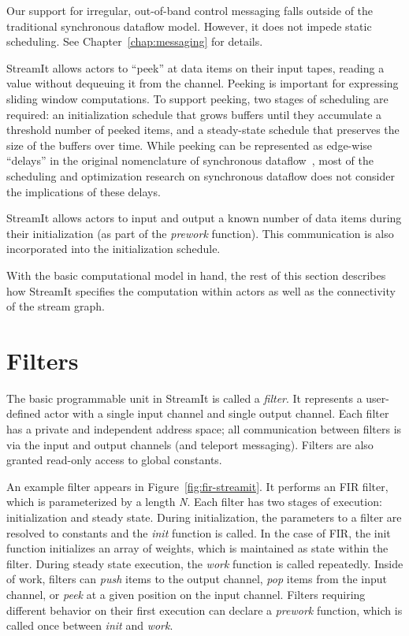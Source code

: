   Our support for irregular,
  out-of-band control messaging falls outside of the traditional
  synchronous dataflow model.  However, it does not impede static
  scheduling.  See Chapter~\ref{chap:messaging} for details.

  StreamIt allows actors to ``peek'' at data items 
  on their input tapes, reading a value without dequeuing it from the
  channel.  Peeking is important for expressing sliding window
  computations.  To support peeking, two stages of scheduling are
  required: an initialization schedule that grows buffers until they
  accumulate a threshold number of peeked items, and a steady-state
  schedule that preserves the size of the buffers over time.  While
  peeking can be represented as edge-wise ``delays'' in the original
  nomenclature of synchronous dataflow~\cite{lee_static_1987}, most of
  the scheduling and optimization research on synchronous dataflow
  does not consider the implications of these delays.

  StreamIt allows
  actors to input and output a known number of data items during their
  initialization (as part of the {\it prework} function).  This
  communication is also incorporated into the initialization schedule.

\myend

With the basic computational model in hand, the rest of this section
describes how StreamIt specifies the computation within actors as well
as the connectivity of the stream graph.

\section{Filters}
\label{sec:filters}

The basic programmable unit in StreamIt is called a {\it filter}.  It
represents a user-defined actor with a single input channel and single
output channel.  Each filter has a private and independent address
space; all communication between filters is via the input and output
channels (and teleport messaging).  Filters are also granted read-only
access to global constants.

An example filter appears in Figure~\ref{fig:fir-streamit}.  It
performs an FIR filter, which is parameterized by a length {\it N}.
Each filter has two stages of execution: initialization and steady
state.  During initialization, the parameters to a filter are resolved
to constants and the {\it init} function is called.  In the case of
FIR, the init function initializes an array of weights, which is
maintained as state within the filter.  During steady state execution,
the {\it work} function is called repeatedly.  Inside of work, filters
can {\it push} items to the output channel, {\it pop} items from the
input channel, or {\it peek} at a given position on the input channel.
Filters requiring different behavior on their first execution can
declare a {\it prework} function, which is called once between {\it
init} and {\it work}.

